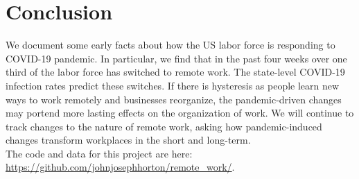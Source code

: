 \documentclass[12pt]{article}
\begin{document}



\section{Conclusion}
We document some early facts about how the US labor force is responding to COVID-19 pandemic.  In particular, we find that in the past four weeks over one third of the labor force has switched to remote work. The state-level COVID-19 infection rates predict these switches.  If there is hysteresis as people learn new ways to work remotely and businesses reorganize, the pandemic-driven changes may portend more lasting effects on the organization of work.
We will continue to track changes to the nature of remote work, asking how pandemic-induced changes transform workplaces in the short and long-term. \\

\noindent The code and data for this project are here:
\href{https://github.com/johnjosephhorton/remote\_work/}{https://github.com/johnjosephhorton/remote\_work/}.


\newpage \clearpage









\end{document}
